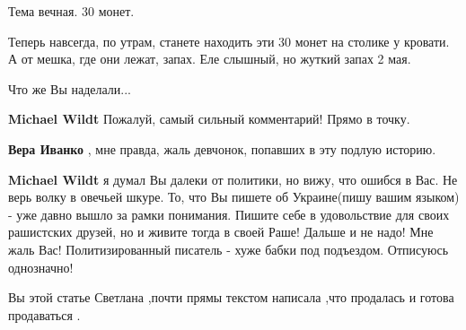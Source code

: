 \begin{itemize}
Тема вечная. 30 монет.

Теперь навсегда, по утрам, станете находить эти 30 монет на столике у кровати.
А от мешка, где они лежат, запах. Еле слышный, но жуткий запах 2 мая.

Что же Вы наделали...

\begin{itemize}
 
\textbf{Michael Wildt} Пожалуй, самый сильный комментарий! Прямо в точку.

 
\textbf{Вера Иванко} , мне правда, жаль девчонок, попавших в эту подлую историю.

 
\textbf{Michael Wildt} я думал Вы далеки от политики, но вижу, что ошибся в Вас.
Не верь волку в овечьей шкуре. То, что Вы пишете об Украине(пишу вашим языком) -
уже давно вышло за рамки понимания. Пишите себе в удовольствие для своих
рашистских друзей, но и живите тогда в своей Раше! Дальше и не надо! Мне жаль
Вас! Политизированный писатель - хуже бабки под подъездом. Отписуюсь
однозначно!
\end{itemize}

 

Вы этой статье Светлана ,почти прямы текстом написала ,что продалась и готова
продаваться .

\begin{itemize}
 

\end{itemize}
\end{itemize}
